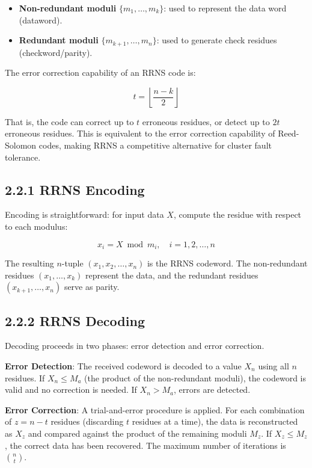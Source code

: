 \documentclass[
  english,
  12pt,
]{report}
\providecommand{\tightlist}{%
  \setlength{\itemsep}{0pt}\setlength{\parskip}{0pt}}
\begin{document}
\begin{itemize}
\tightlist
\item
  \textbf{Non-redundant moduli} \(\{m_1, \ldots, m_k\}\): used to
  represent the data word (dataword).
\item
  \textbf{Redundant moduli} \(\{m_{k+1}, \ldots, m_n\}\): used to
  generate check residues (checkword/parity).
\end{itemize}

The error correction capability of an RRNS code is:

\[t = \left\lfloor \frac{n - k}{2} \right\rfloor\]

That is, the code can correct up to \(t\) erroneous residues, or detect
up to \(2t\) erroneous residues. This is equivalent to the error
correction capability of Reed-Solomon codes, making RRNS a competitive
alternative for cluster fault tolerance.

\subsection{2.2.1 RRNS Encoding}\label{rrns-encoding}

Encoding is straightforward: for input data \(X\), compute the residue
with respect to each modulus:

\[x_i = X \bmod m_i, \quad i = 1, 2, \ldots, n\]

The resulting \(n\)-tuple \((x_1, x_2, \ldots, x_n)\) is the RRNS
codeword. The non-redundant residues \((x_1, \ldots, x_k)\) represent
the data, and the redundant residues \((x_{k+1}, \ldots, x_n)\) serve as
parity.

\subsection{2.2.2 RRNS Decoding}\label{rrns-decoding}

Decoding proceeds in two phases: error detection and error correction.

\textbf{Error Detection}: The received codeword is decoded to a value
\(X_n\) using all \(n\) residues. If \(X_n \leq M_a\) (the product of
the non-redundant moduli), the codeword is valid and no correction is
needed. If \(X_n > M_a\), errors are detected.

\textbf{Error Correction}: A trial-and-error procedure is applied. For
each combination of \(z = n - t\) residues (discarding \(t\) residues at
a time), the data is reconstructed as \(X_z\) and compared against the
product of the remaining moduli \(M_z\). If \(X_z \leq M_z\), the
correct data has been recovered. The maximum number of iterations is
\(\binom{n}{t}\).
\end{document}
